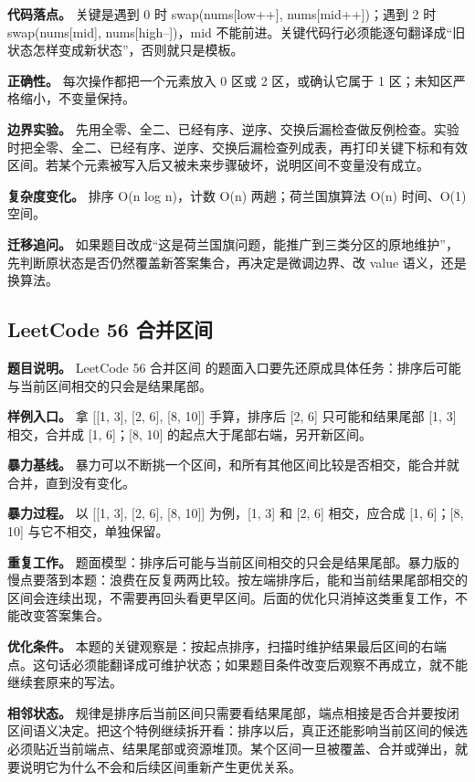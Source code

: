 \textbf{代码落点。} 关键是遇到 0 时 swap(nums[low++], nums[mid++])；遇到 2 时 swap(nums[mid], nums[high--])，mid 不能前进。关键代码行必须能逐句翻译成“旧状态怎样变成新状态”，否则就只是模板。

\textbf{正确性。} 每次操作都把一个元素放入 0 区或 2 区，或确认它属于 1 区；未知区严格缩小，不变量保持。

\textbf{边界实验。} 先用全零、全二、已经有序、逆序、交换后漏检查做反例检查。实验时把全零、全二、已经有序、逆序、交换后漏检查列成表，再打印关键下标和有效区间。若某个元素被写入后又被未来步骤破坏，说明区间不变量没有成立。

\textbf{复杂度变化。} 排序 O(n log n)，计数 O(n) 两趟；荷兰国旗算法 O(n) 时间、O(1) 空间。

\textbf{迁移追问。} 如果题目改成“这是荷兰国旗问题，能推广到三类分区的原地维护”，先判断原状态是否仍然覆盖新答案集合，再决定是微调边界、改 value 语义，还是换算法。

\subsection{LeetCode 56 合并区间}

\textbf{题目说明。} LeetCode 56 合并区间 的题面入口要先还原成具体任务：排序后可能与当前区间相交的只会是结果尾部。

\textbf{样例入口。} 拿 [[1, 3], [2, 6], [8, 10]] 手算，排序后 [2, 6] 只可能和结果尾部 [1, 3] 相交，合并成 [1, 6]；[8, 10] 的起点大于尾部右端，另开新区间。

\textbf{暴力基线。} 暴力可以不断挑一个区间，和所有其他区间比较是否相交，能合并就合并，直到没有变化。

\textbf{暴力过程。} 以 [[1, 3], [2, 6], [8, 10]] 为例，[1, 3] 和 [2, 6] 相交，应合成 [1, 6]；[8, 10] 与它不相交，单独保留。

\textbf{重复工作。} 题面模型：排序后可能与当前区间相交的只会是结果尾部。暴力版的慢点要落到本题：浪费在反复两两比较。按左端排序后，能和当前结果尾部相交的区间会连续出现，不需要再回头看更早区间。后面的优化只消掉这类重复工作，不能改变答案集合。

\textbf{优化条件。} 本题的关键观察是：按起点排序，扫描时维护结果最后区间的右端点。这句话必须能翻译成可维护状态；如果题目条件改变后观察不再成立，就不能继续套原来的写法。

\textbf{相邻状态。} 规律是排序后当前区间只需要看结果尾部，端点相接是否合并要按闭区间语义决定。把这个特例继续拆开看：排序以后，真正还能影响当前区间的候选必须贴近当前端点、结果尾部或资源堆顶。某个区间一旦被覆盖、合并或弹出，就要说明它为什么不会和后续区间重新产生更优关系。

